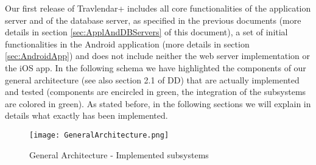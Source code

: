 Our first release of Travlendar+ includes all core functionalities of the application server and of the database server, as specified in the previous documents (more details in section \ref{sec:ApplAndDBServers} of this document), a set of initial functionalities in the Android application (more details in section \ref{sec:AndroidApp}) and does not include neither the web server implementation or the iOS app.
In the following schema we have highlighted the components of our general architecture (see also section 2.1 of DD) that are actually implemented and tested (components are encircled in green, the integration of the subsystems are colored in green). As stated before, in the following sections we will explain in details what exactly has been implemented.
\begin{figure}[H]
	\begin{center}
		\hspace*{-40pt}
		\texttt{[image: GeneralArchitecture.png]}
	\end{center}
\caption{General Architecture - Implemented subsystems}
\end{figure}

\newpage

